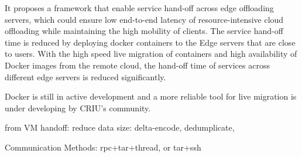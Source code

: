 It proposes a framework that enable service hand-off across edge offloading servers, which could ensure low end-to-end latency of resource-intensive cloud offloading while maintaining the high mobility of clients. The service hand-off time is reduced by deploying docker containers to the Edge servers that are close to users. With the high speed live migration of containers and high availability of Docker images from the remote cloud, the hand-off time of services across different edge servers is reduced significantly.
    
    
Docker is still in active development and a more reliable tool for live migration is under developing by CRIU's community.

from VM handoff: reduce data size: delta-encode, dedumplicate,

Communication Methods: rpc+tar+thread, or tar+ssh